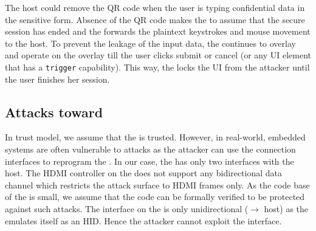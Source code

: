  The host could remove the QR code when the user is typing confidential data in the sensitive form. Absence of the QR code makes the \device to assume that the secure session has ended and the \device forwards the plaintext keystrokes and mouse movement to the host. To prevent the leakage of the input data, the \device continues to overlay and operate on the overlay till the user clicks submit or cancel (or any UI element that has a \texttt{trigger}  capability). This way, the \device locks the UI from the attacker until the user finishes her session.

\subsection{Attacks toward \device} 

In \name trust model, we assume that the \device is trusted. However, in real-world, embedded systems are often vulnerable to attacks as the attacker can use the connection interfaces to reprogram the \device. In our case, the \device has only two interfaces with the host. The HDMI controller on the \device does not support any bidirectional data channel which restricts the attack surface to HDMI frames only.
As the code base of the \device is small, we assume that the code can be formally verified to be protected against such attacks. The \usb interface on the \device is only unidirectional (\device $\rightarrow$ host) as the \device emulates itself as an HID. Hence the attacker cannot exploit the \usb interface.  
